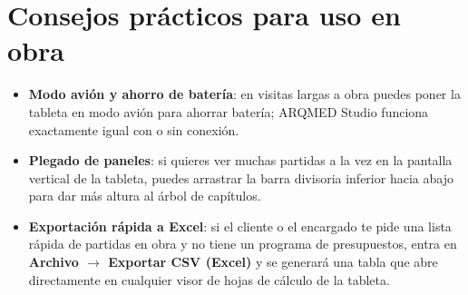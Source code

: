 \documentclass[11pt,a4paper]{article}
\begin{document}
\section{Consejos prácticos para uso en obra}

\begin{itemize}[leftmargin=*]
    \item \textbf{Modo avión y ahorro de batería}: en visitas largas a obra puedes poner la tableta en modo avión para ahorrar batería; ARQMED Studio funciona exactamente igual con o sin conexión.
    \item \textbf{Plegado de paneles}: si quieres ver muchas partidas a la vez en la pantalla vertical de la tableta, puedes arrastrar la barra divisoria inferior hacia abajo para dar más altura al árbol de capítulos.
    \item \textbf{Exportación rápida a Excel}: si el cliente o el encargado te pide una lista rápida de partidas en obra y no tiene un programa de presupuestos, entra en \textbf{Archivo $\rightarrow$ Exportar CSV (Excel)} y se generará una tabla que abre directamente en cualquier visor de hojas de cálculo de la tableta.
\end{itemize}
\end{document}
